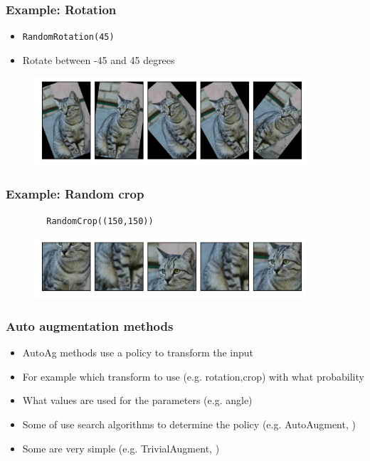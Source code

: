 \documentclass{beamer}
\begin{document}
\begin{frame}[fragile]
    \frametitle{Example: Rotation}
    \begin{itemize}
        \item  \lstinline!RandomRotation(45)!
        \item  Rotate between -45 and 45 degrees
    \end{itemize}
 
       
\begin{figure}
    \begin{center}
       \includegraphics[width=0.9\textwidth]{figs/rotate.png} 
    \end{center}
\end{figure}
\end{frame}

\begin{frame}[fragile]
    \frametitle{Example: Random crop}
    
    \begin{lstlisting}
        RandomCrop((150,150))
        \end{lstlisting}
\begin{figure}
    \begin{center}
       \includegraphics[width=0.9\textwidth]{figs/crop.png} 
    \end{center}
\end{figure}
\end{frame}


\begin{frame}
    \frametitle{Auto augmentation methods}
\begin{itemize}
    \item AutoAg methods use a policy to transform the input
    \item For example which transform to use (e.g. rotation,crop) with what probability
    \item What values are used for the parameters (e.g. angle)
    \item Some of use search algorithms to determine the policy (e.g. AutoAugment, \cite{dogus2018})
    \item Some are very simple (e.g. TrivialAugment,  \cite{muller2021})
\end{itemize}
    

\end{frame}
\end{document}
